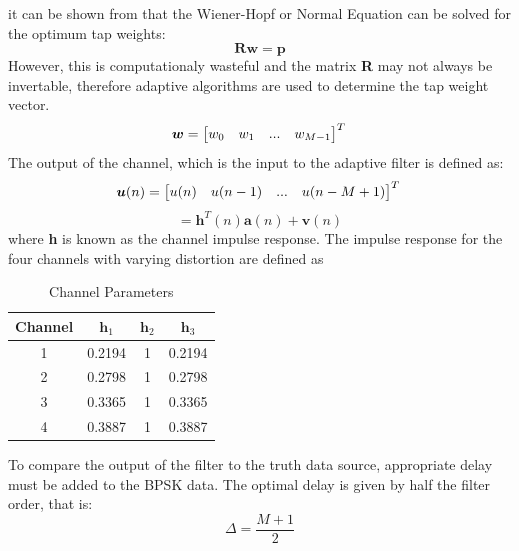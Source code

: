 \documentclass[journal]{IEEEtran}
\begin{document}
it can be shown from \cite{haykin2008adaptive} that the Wiener-Hopf or Normal Equation can be solved for
the optimum tap weights:
 $$\boldsymbol{Rw} = \boldsymbol{p}$$
However, this is computationaly wasteful and the matrix \textbf{R} may not
always be invertable, therefore adaptive algorithms are used to determine the tap weight vector.
\[
\boldsymbol{w} =\begin{bmatrix}w_0 & w_1 & ... & w_{M-1}\end{bmatrix}^T\\\mbox{}
\]
The output of the channel, which is the input to the adaptive filter is defined as:
\[
\boldsymbol{u}(n) =\begin{bmatrix}u(n) & u(n-1) & ...  & u(n-M+1)\end{bmatrix}^T\\\mbox{}
\]
$$= \boldsymbol{h}^T(n)\boldsymbol{a}(n) + \boldsymbol{v}(n)$$
where  \textbf{h} is known as the channel impulse response. The impulse response for the four channels
with varying distortion are defined as
\begin{table}[H]
\centering
\captionsetup{font = small}
 \begin{tabular}{ | c || c | c | c |}
    \hline
    Channel & $\boldsymbol{h}_1$ & $\boldsymbol{h}_2$ & $\boldsymbol{h}_3$\\
    \hline\hline
    1 & 0.2194 & 1 & 0.2194 \\
    \hline
    2 & 0.2798 & 1 & 0.2798 \\
    \hline
    3 & 0.3365 & 1 & 0.3365\\
    \hline
    4 & 0.3887 & 1 & 0.3887\\
    \hline
  \end{tabular}
  \caption{Channel Parameters}
  \label{table:channel}
\end{table}
To compare the output of the filter to the truth data source, appropriate delay must be added to the BPSK data. The optimal delay is given by
half the filter order, that is:
$$\Delta = \dfrac{M+1}{2}$$
\end{document}
